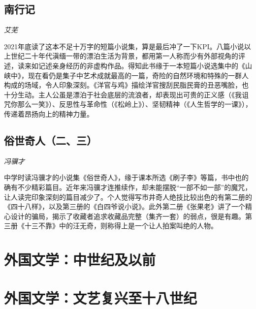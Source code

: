 \subsection*{南行记}
\par \emph{艾芜} 
\par 2021年底读了这本不足十万字的短篇小说集，算是最后冲了一下KPI。八篇小说以上世纪二十年代滇缅一带的漂泊生活为背景，都用第一人称而少有外部视角的评述，读来如记述亲身经历的非虚构作品。得知此书缘于一本短篇小说选集中的《山峡中》，现在看仍是集子中艺术成就最高的一篇，奇险的自然环境和特殊的一群人构成的场域，令人印象深刻。《洋官与鸡》描绘洋官搜刮民脂民膏的丑恶嘴脸，也十分生动。主人公虽是漂泊于社会底层的流浪者，却表现出可贵的正义感（《我诅咒你那么一笑》）、反思性与革命性（《松岭上》）、坚韧精神（《人生哲学的一课》），传递着昂扬向上的精神力量。
\par {}

\subsection*{俗世奇人（二、三）}
\par \emph{冯骥才} 
\par 中学时读冯骥才的小说集《俗世奇人》，缘于课本所选《刷子李》等篇，书中也的确有不少精彩篇目。近年来冯骥才连推续作，却未能摆脱“一部不如一部”的魔咒，让人读完印象深刻的篇目减少了。个人觉得写市井奇人绝技比较出色的有第二册的《四十八样》，以及第三册的《白四爷说小说》。此外第二册《张果老》讲了一个精心设计的骗局，揭示了收藏者追求收藏品完整（集齐一套）的弱点，很是有趣。第三册《十三不靠》中的汪无奇，则称得上是一个让人拍案叫绝的人物。
\par {}


\section{外国文学：中世纪及以前}

\section{外国文学：文艺复兴至十八世纪}

